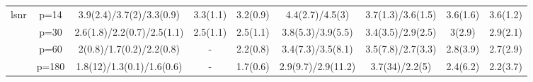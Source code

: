 \begin{table}[ht]
{\begin{tabular}{|c|c|ccccccc|}
  \midrule\multirow{4}[2]{*}{lsnr} & p=14 & 3.9(2.4)/3.7(2)/3.3(0.9) & 3.3(1.1) & 3.2(0.9) & 4.4(2.7)/4.5(3) & 3.7(1.3)/3.6(1.5) & 3.6(1.6) & 3.6(1.2) \\ 
   & p=30 & 2.6(1.8)/2.2(0.7)/2.5(1.1) & 2.5(1.1) & 2.5(1.1) & 3.8(5.3)/3.9(5.5) & 3.4(3.5)/2.9(2.5) & 3(2.9) & 2.9(2.1) \\ 
   & p=60 & 2(0.8)/1.7(0.2)/2.2(0.8) & - & 2.2(0.8) & 3.4(7.3)/3.5(8.1) & 3.5(7.8)/2.7(3.3) & 2.8(3.9) & 2.7(2.9) \\ 
   & p=180 & 1.8(12)/1.3(0.1)/1.6(0.6) & - & 1.7(0.6) & 2.9(9.7)/2.9(11.2) & 3.7(34)/2.2(5) & 2.4(6.2) & 2.2(3.7) \\ 
   \bottomrule 
\end{tabular}
}
\end{table}
